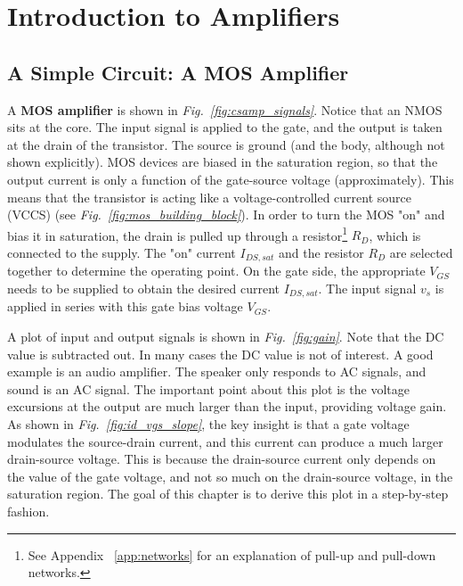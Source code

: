 \section{Introduction to Amplifiers}
\subsection{A Simple Circuit: A MOS Amplifier}
A \textbf{MOS amplifier} is shown in \emph{Fig.~\ref{fig:csamp_signals}}.  Notice that an NMOS sits at the core.  The input signal is applied to the gate, and the output is taken at the drain of the transistor.  The source is ground (and the body, although not shown explicitly).  MOS devices are biased in the saturation region, so that the output current is only a function of the gate-source voltage (approximately).  This means that the transistor is acting like a voltage-controlled current source (VCCS) (see \emph{Fig.~\ref{fig:mos_building_block}}).  In order to turn the MOS "on" and bias it in saturation, the drain is pulled up through a resistor\footnote{See Appendix ~\ref{app:networks} for an explanation of pull-up and pull-down networks.} $R_D$, which is connected to the supply.  The "on" current $I_{DS,sat}$ and the resistor $R_D$ are selected together to determine the operating point.  On the gate side, the appropriate $V_{GS}$ needs to be supplied to obtain the desired current $I_{DS,sat}$.  The input signal $v_{s}$ is applied in series with this gate bias voltage $V_{GS}$.

A plot of input and output signals is shown in \emph{Fig.~\ref{fig:gain}}.  Note that the DC value is subtracted out.  In many cases the DC value is not of interest.  A good example is an audio amplifier.  The speaker only responds to AC signals, and sound is an AC signal.  The important point about this plot is the voltage excursions at the output are much larger than the input, providing voltage gain.  As shown in \emph{Fig.~\ref{fig:id_vgs_slope}}, the key insight is that a gate voltage modulates the source-drain current, and this current can produce a much larger drain-source voltage.  This is because the drain-source current only depends on the value of the gate voltage, and not so much on the drain-source voltage, in the saturation region. The goal of this chapter is to derive this plot in a step-by-step fashion.
